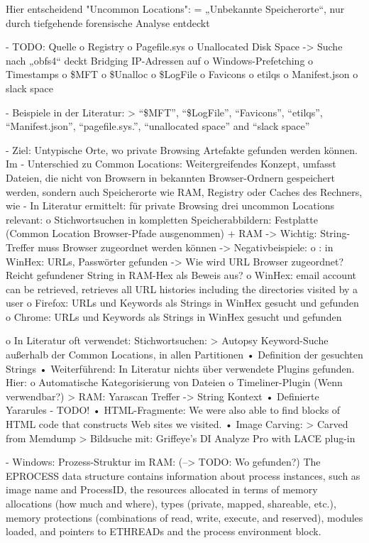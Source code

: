 Hier entscheidend "Uncommon Locations":
	= „Unbekannte Speicherorte“, nur durch tiefgehende forensische Analyse entdeckt
	
	- TODO: Quelle
	o	Registry
	o	Pagefile.sys
	o	Unallocated Disk Space
	->	Suche nach „obfs4“ deckt Bridging IP-Adressen auf
	o	Windows-Prefetching
	o	Timestamps
	o	\$MFT
	o	\$Unalloc
	o	\$LogFile
	o	Favicons
	o	etilqs
	o	Manifest.json
	o	slack space
	
	- Beispiele in der Literatur:
	> “\$MFT”, “\$LogFile”, “Favicons”, “etilqs”, “Manifest.json”, “pagefile.sys.”, “unallocated space” and “slack space” \cite{Montasari.2015}	
	
	-	Ziel: Untypische Orte, wo private Browsing Artefakte gefunden werden können. Im
	-	Unterschied zu Common Locations: Weitergreifendes Konzept, umfasst Dateien, die nicht von Browsern in bekannten Browser-Ordnern gespeichert werden, sondern auch Speicherorte wie RAM, Registry oder Caches des Rechners, wie 
	-	In Literatur ermittelt: für private Browsing drei uncommon Locations relevant:
	o	Stichwortsuchen in kompletten Speicherabbildern: Festplatte (Common Location Browser-Pfade ausgenommen) + RAM 
	-> Wichtig: String-Treffer muss Browser zugeordnet werden können
	-> Negativbeispiele:
	o \cite{Rochmadi.2017}: in WinHex: URLs, Passwörter gefunden -> Wie wird URL Browser zugeordnet? Reicht gefundener String in RAM-Hex als Beweis aus?
	o \cite{Md.2018} WinHex: email account can be retrieved, retrieves all URL histories including the directories visited by a user
	o \cite{Montasari.2015}	Firefox: URLs und Keywords als Strings in WinHex gesucht und gefunden 
	o \cite{Montasari.2015}	Chrome: URLs und Keywords als Strings in WinHex gesucht und gefunden
	
o	In Literatur oft verwendet: Stichwortsuchen:
	>	Autopsy Keyword-Suche außerhalb der Common Locations, in allen Partitionen
		•	Definition der gesuchten Strings
		•	Weiterführend:  In Literatur nichts über verwendete Plugins gefunden. Hier:
			o	Automatische Kategorisierung von Dateien
			o	Timeliner-Plugin (Wenn verwendbar?)
	>	RAM: Yarascan Treffer -> String Kontext
		•	Definierte Yararules
			- TODO!
		•	HTML-Fragmente: \cite{Said.2011} We were also able to find blocks of HTML code that constructs Web sites we visited.
		•	Image Carving: 
	> Carved from Memdump \cite{Ohana.2013}
	> Bildsuche mit: Griffeye’s DI Analyze Pro with LACE plug-in \cite{Horsman.2019}

- Windows: Prozess-Struktur im RAM: 
	(--> TODO: Wo gefunden?)
	The EPROCESS data structure contains information about process instances, such as image name and ProcessID, the resources allocated in terms of memory allocations (how much and where), types (private, mapped, shareable, etc.), memory protections (combinations of read, write, execute, and reserved), modules loaded, and pointers to ETHREADs and the process environment block.
	
